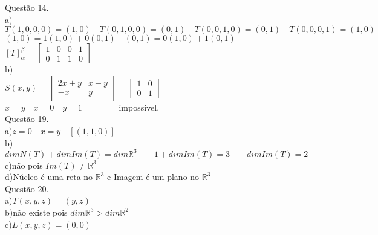 \documentclass[12pt]{article}
\begin{document}
\noindent Questão 14.\\

\noindent a)\\

$T(1,0,0,0)=(1,0)\quad T(0,1,0,0)=(0,1)\quad T(0,0,1,0)=(0,1)\quad T(0,0,0,1)=(1,0)$\\

$(1,0)=1(1,0)+0(0,1)\quad(0,1)=0(1,0)+1(0,1)$\\

$[T]_{\alpha}^{\beta}=\begin{bmatrix}1&0&0&1\\0&1&1&0\end{bmatrix}$\\

\noindent b)\\
	
$S(x,y)=\begin{bmatrix}2x+y&x-y\\-x&y\end{bmatrix}=\begin{bmatrix}1&0\\0&1\end{bmatrix}$\\

$x=y\quad x=0\quad y=1\qquad\qquad$ impossível.\\

\noindent Questão 19.\\

\noindent a)\quad$z=0\quad x=y\quad [(1,1,0)]$\\

\noindent b)\quad$dimN(T)+dimIm(T)=dim\mathds{R}^{3}\qquad 1+dimIm(T)=3\qquad dimIm(T)=2$\\
	
\noindent c)\quad não pois $Im(T)\neq\mathds{R}^{3}$\\

\noindent d)\quad Núcleo é uma reta no $\mathds{R}^{3}$ e Imagem é um plano no $\mathds{R}^{3}$\\

\noindent Questão 20.\\

\noindent a)\quad$T(x,y,z)=(y,z)$\\

\noindent b)\quad não existe pois $dim\mathds{R}^{3}>dim\mathds{R}^{2}$\\

\noindent c)\quad$L(x,y,z)=(0,0)$\\
\end{document}
